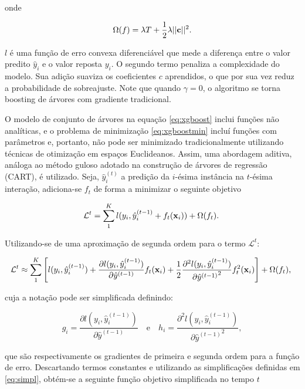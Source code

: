 \noindent
onde 

\begin{equation}
\Omega(f)=\lambda{T}+\frac{1}{2}\lambda||{\bf c}||^2\mbox{.}
\end{equation}

$l$ é uma função de erro convexa diferenciável que mede a diferença entre o valor predito $\hat{y}_i$ e o valor reposta $y_i$. O segundo termo penaliza a complexidade do modelo. Sua adição suaviza os coeficientes $c$ aprendidos, o que por sua vez reduz a probabilidade de sobreajuste. Note que quando $\gamma=0$, o algoritmo se torna boosting de árvores com gradiente tradicional.

O modelo de conjunto de árvores na equação \eqref{eq:xgboost} inclui funções não analíticas, e o problema de minimização \eqref{eq:xgboostmin} incluí funções com parâmetros e, portanto, não pode ser minimizado tradicionalmente utilizando técnicas de otimização em espaços Euclideanos. Assim, uma abordagem aditiva, análoga ao método guloso adotado na construção de árvores de regressão (CART), é utilizado. Seja, $\hat{y}_{i}^{(t)}$ a predição da $i$-ésima instância na $t$-ésima interação, adiciona-se $f_t$ de forma a minimizar o seguinte objetivo

\begin{equation}
\mathcal{L}^{t}=\sum_{1}^{K}l(y_i, \hat{y}_i^{(t-1)}+f_t({\bf x}_i))+\Omega(f_t)\mbox{.}~
\end{equation}

Utilizando-se de uma aproximação de segunda ordem para o termo $\mathcal{L}^{t}$:

\begin{equation}
\mathcal{L}^{t}\approx\sum_{1}^{K}\left[l(y_i, \hat{y}_i^{(t-1)})+\frac{\partial l(y_i, \hat{y}_i^{(t-1)})}{\partial\hat{y }^{(t-1)}}f_t({\bf x}_i)+\frac{1}{2}\frac{\partial^2 l(y_i, \hat{y}_i^{(t-1)})}{{\partial\hat{y }^{(t-1)}}^2}f_t^2({\bf x}_i)\right]+\Omega(f_t)\mbox{,}~
\end{equation}

cuja a notação pode ser simplificada definindo:

\begin{equation}\label{eq:simpl}
g_i=\frac{\partial l(y_i, \hat{y}_i^{(t-1)})}{\partial\hat{y }^{(t-1)}} \quad \mbox{e} \quad h_i=\frac{\partial^2 l(y_i, \hat{y}_i^{(t-1)})}{{\partial\hat{y }^{(t-1)}}^2}\mbox{,}~
\end{equation}

que são respectivamente os gradientes de primeira e segunda ordem para a função de erro. Descartando termos constantes e utilizando as simplificações definidas em \eqref{eq:simpl}, obtém-se a seguinte função objetivo simplificada no tempo $t$

